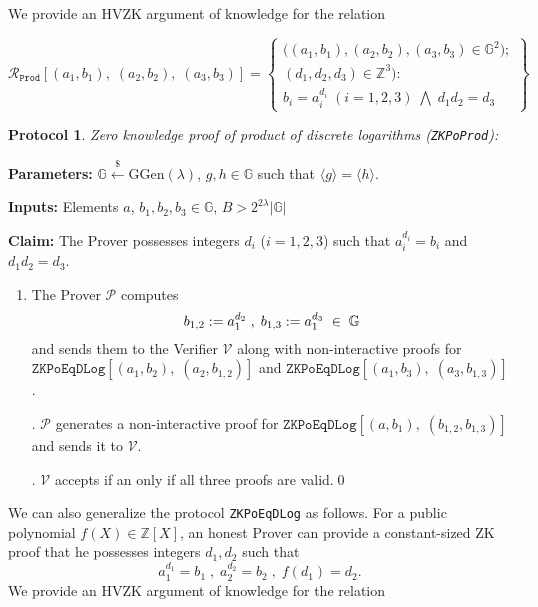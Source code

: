 \documentclass[11pt, lettersize, notitlepage, leqno, footskip=0.6cm]{article}
\newcommand{\bz}{\mathbb Z}
\newcommand{\ttt}{\texttt}
\newcommand{\bG}{\mathbb{G}}
\newcommand{\la}{\langle}
\newcommand{\ra}{\rangle}
\newcommand{\mc}{\mathcal}
\newcommand{\mb}{\mathbb}
\newcommand{\mr}{\mathrm}
\newcommand{\lam}{\lambda}
\newcommand{\lamb}{\lambda}
\newcommand{\mP}{\mc{P}}
\newcommand{\V}{\mc{V}}
\newcommand{\vs}{\vspace{-0.15cm}}
\newcommand{\noin}{\noindent}
\newtheorem{Prot}[Thm]{Protocol}
\numberwithin{equation}{section}
\begin{document}
\noin We provide an HVZK argument of knowledge for the relation 

\[
  \mc{R}_{{\ttt{Prod}}}[(a_1, b_1),\;(a_2,b_2),\;(a_3,b_3)] = \left\{\begin{array}{l}
    \big((a_1, b_1), (a_2,b_2), (a_3,b_3)\in\mb{G}^2);\\
    (d_1, d_2, d_3)\in\mb{Z}^3): \\
    b_i = a_i^{d_i}\;(i=1,2,3)\; \bigwedge\; d_1d_2 = d_3
  \end{array}\right\}
\] 

\vspace{0.1cm}

\begin{Prot} \normalfont \hypertarget{PoProd}{\textit{Zero knowledge proof of product of discrete logarithms}} (\verb|ZKPoProd|):\end{Prot} \vspace{-0.3cm}

\noin \textbf{Parameters:} $\mb{G}\xleftarrow{\$} \mr{GGen}(\lamb)$,  $g,h\in \mb{G}$ such that $\la g \ra = \la h \ra$.

\noin \textbf{Inputs:} Elements $a$, $b_1, b_2, b_3 \in \mb{G}$, $B > 2^{2\lam}|\bG|$

\noin \textbf{Claim:} The Prover possesses integers $d_i$ ($i=1,2,3$) such that $a_i^{d_i} = b_i$ and $d_1d_2 = d_3$.

\begin{enumerate}[wide, labelwidth=!, labelindent=0pt]\vs \item The Prover $\mP$ computes \vs $$b_{1,2}:= a_1^{d_2}\;,\; b_{1,3}:= a_1^{d_3}\;\in\;\bG \vs $$ and sends them to the Verifier $\V$ along with non-interactive proofs for $\ttt{ZKPoEqDLog}[(a_1,b_2),\;(a_2,b_{1,2})]$ and $\ttt{ZKPoEqDLog}[(a_1,b_3),\;(a_3,b_{1,3})]$.

\noin 2. $\mP$ generates a non-interactive proof for $\ttt{ZKPoEqDLog}[(a, b_1),\;(b_{1,2}, b_{1,3})]$ and sends it to $\V$.

\noin 3. $\V$ accepts if an only if all three proofs are valid.\qed\end{enumerate}



\noin We can also generalize the protocol \verb|ZKPoEqDLog| as follows. For a public polynomial {$f(X)\in \bz[X]$}, an honest Prover can provide a constant-sized ZK proof that he possesses integers $d_1,d_2$ such that \vs $$a_1^{d_1} = b_1\;,\;a_2^{d_2} = b_2\;,\;f(d_1) = d_2. $$ We provide an HVZK argument of knowledge for the relation \vs
\end{document}
